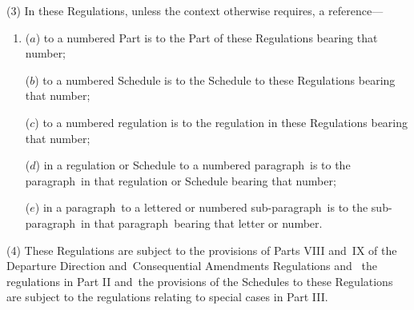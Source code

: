 \documentclass[12pt,a4paper]{article}
\begin{document}
(3) In these Regulations, unless the context otherwise requires, a reference—
\begin{enumerate}\item[]
($a$) to a numbered Part is to the Part of these Regulations bearing that number;

($b$) to a numbered Schedule is to the Schedule to these Regulations bearing that number;

($c$) to a numbered regulation is to the regulation in these Regulations bearing that number;

($d$) in a regulation or Schedule to a numbered paragraph~is to the paragraph~in that regulation or Schedule bearing that number;

($e$) in a paragraph~to a lettered or numbered sub-paragraph~is to the sub-paragraph~in that paragraph~bearing that letter or number.
\end{enumerate}

(4) 
These Regulations are subject to the provisions of Parts VIII and~IX of the Departure Direction and~Consequential Amendments Regulations and~ %
the regulations in Part II and~the provisions of the Schedules to these Regulations are subject to the regulations relating to special cases in Part III.
\end{document}
